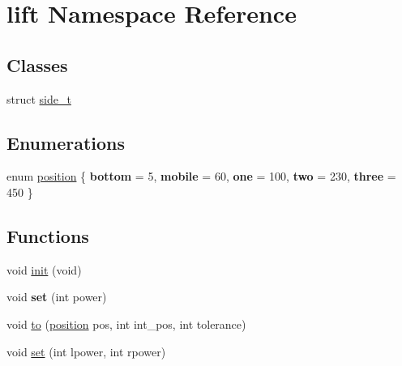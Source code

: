 \hypertarget{namespacelift}{}\section{lift Namespace Reference}
\label{namespacelift}
\subsection*{Classes}
\begin{DoxyCompactItemize}
\item 
struct \hyperlink{structlift_1_1side__t}{side\+\_\+t}
\end{DoxyCompactItemize}
\subsection*{Enumerations}
\begin{DoxyCompactItemize}
\item 
enum \hyperlink{namespacelift_a4a1c349e765b3b8489da50822876099d}{position} \{ \newline
{\bfseries bottom} = 5, 
{\bfseries mobile} = 60, 
{\bfseries one} = 100, 
{\bfseries two} = 230, 
\newline
{\bfseries three} = 450
 \}
\end{DoxyCompactItemize}
\subsection*{Functions}
\begin{DoxyCompactItemize}
\item 
void \hyperlink{namespacelift_af207a144f6c87583f4abbb9cb3f9838f}{init} (void)
\item 
\mbox{\label{namespacelift_a23a3c797260ed5501dc1fa0b1958bb37}} 
void {\bfseries set} (int power)
\item 
void \hyperlink{namespacelift_abbdfe6685b8239a74b18bb9d5ba80d02}{to} (\hyperlink{namespacelift_a4a1c349e765b3b8489da50822876099d}{position} pos, int int\+\_\+pos, int tolerance)
\item 
void \hyperlink{namespacelift_ac4499bdf3cd48c060118c4cbea45ff1c}{set} (int lpower, int rpower)
\end{DoxyCompactItemize}

